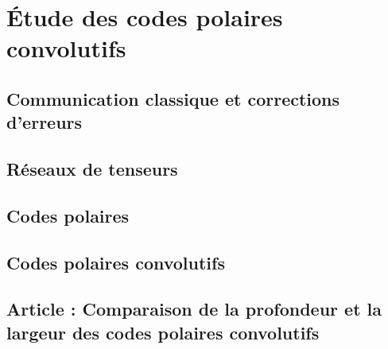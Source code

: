 \begin{comment}
\end{comment}

\chapter{Étude des codes polaires convolutifs}

\section{Communication classique et corrections d'erreurs}

\section{Réseaux de tenseurs}

\section{Codes polaires}

\section{Codes polaires convolutifs}

\section{Article : Comparaison de la profondeur et la largeur des codes polaires convolutifs}
